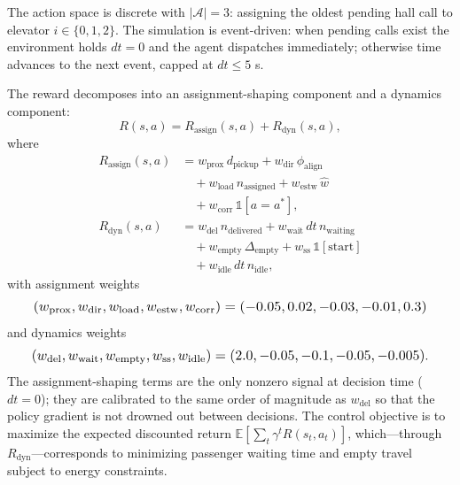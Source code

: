 \documentclass[conference]{IEEEtran}
\begin{document}
The action space is discrete with $|\mathcal{A}| = 3$: assigning the
oldest pending hall call to elevator $i \in \{0, 1, 2\}$. The
simulation is event-driven: when pending calls exist the environment
holds $dt = 0$ and the agent dispatches immediately; otherwise time
advances to the next event, capped at $dt \le 5$ s.

The reward decomposes into an assignment-shaping component and a
dynamics component:
\begin{equation}
R(s, a) = R_{\mathrm{assign}}(s, a) + R_{\mathrm{dyn}}(s, a),
\end{equation}
where
\begin{align}
R_{\mathrm{assign}}(s, a) &= w_{\mathrm{prox}}\, d_{\mathrm{pickup}} +
w_{\mathrm{dir}}\, \phi_{\mathrm{align}} \nonumber \\
&\quad + w_{\mathrm{load}}\, n_{\mathrm{assigned}} +
w_{\mathrm{estw}}\, \hat{w} \nonumber \\
&\quad + w_{\mathrm{corr}}\, \mathbb{1}[a = a^*], \\
R_{\mathrm{dyn}}(s, a) &= w_{\mathrm{del}}\, n_{\mathrm{delivered}} +
w_{\mathrm{wait}}\, dt\, n_{\mathrm{waiting}} \nonumber \\
&\quad + w_{\mathrm{empty}}\, \Delta_{\mathrm{empty}} +
w_{\mathrm{ss}}\, \mathbb{1}[\mathrm{start}] \nonumber \\
&\quad + w_{\mathrm{idle}}\, dt\, n_{\mathrm{idle}},
\end{align}
with assignment weights
\begin{equation}
\resizebox{0.92\columnwidth}{!}{$
(w_{\mathrm{prox}}, w_{\mathrm{dir}}, w_{\mathrm{load}},
w_{\mathrm{estw}}, w_{\mathrm{corr}}) = (-0.05, 0.02, -0.03,
-0.01, 0.3)
$}
\end{equation}
and dynamics weights
\begin{equation}
\resizebox{0.92\columnwidth}{!}{$
(w_{\mathrm{del}}, w_{\mathrm{wait}}, w_{\mathrm{empty}},
w_{\mathrm{ss}}, w_{\mathrm{idle}}) = (2.0, -0.05, -0.1,
-0.05, -0.005)
$}.
\end{equation}
The assignment-shaping terms are the only nonzero signal at decision
time ($dt = 0$); they are calibrated to the same order of magnitude as
$w_{\mathrm{del}}$ so that the policy gradient is not drowned out
between decisions. The control objective is to maximize
the expected discounted return
$\mathbb{E}[\sum_t \gamma^t R(s_t, a_t)]$, which---through
$R_{\mathrm{dyn}}$---corresponds to minimizing passenger waiting time
and empty travel subject to energy constraints.
\end{document}
